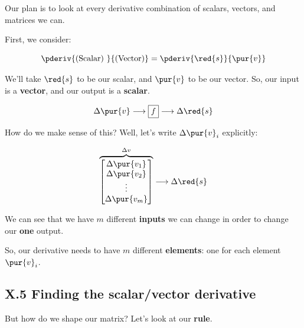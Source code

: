         Our plan is to look at every derivative combination of scalars, vectors, and matrices we can.
        
        First, we consider:
        
        \begin{equation}
            \pderiv{ \text{(Scalar) } } { \text{(Vector)} }
            =
            \pderiv{\red{s}}{ \pur{v} } 
        \end{equation}
        
        We'll take $\red{s}$ to be our scalar, and $\pur{v}$ to be our vector. So, our input is a \textbf{vector}, and our output is a \textbf{scalar}.
        
        \begin{equation}
            \Delta \pur{v}
            \longrightarrow
            \boxed{f}
            \longrightarrow
            \Delta \red{s}
        \end{equation}
        
        How do we make sense of this? Well, let's write $\Delta \pur{v}_i$ explicitly:
        
        \begin{equation}
            \overbrace{
                \begin{bmatrix}
                    \Delta \pur{v_1}\\ \Delta \pur{v_2}\\ \vdots \\ \Delta \pur{v_m}
                \end{bmatrix}
            }^{\Delta v}
            \longrightarrow 
            \Delta \red{s}
        \end{equation}
        
        We can see that we have $m$ different \textbf{inputs} we can change in order to change our \textbf{one} output.
        
        So, our derivative needs to have $m$ different \textbf{elements}: one for each element $\pur{v}_i$.
    
    \secdiv
       
    \subsection*{X.5 \quad Finding the scalar/vector derivative}
        
        But how do we shape our matrix? Let's look at our \textbf{rule}.
        
